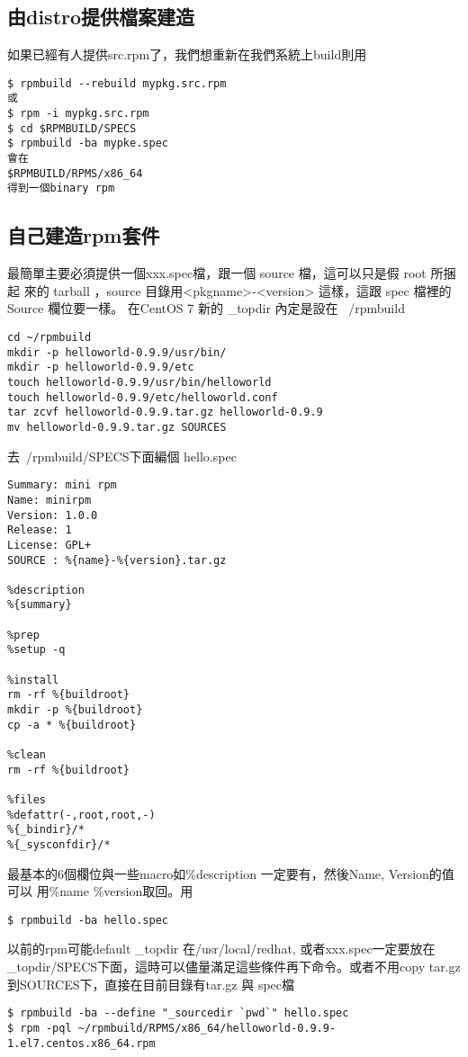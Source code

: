   \subsection{由distro提供檔案建造}
  如果已經有人提供src.rpm了，我們想重新在我們系統上build則用
  \begin{verbatim}
$ rpmbuild --rebuild mypkg.src.rpm
或
$ rpm -i mypkg.src.rpm
$ cd $RPMBUILD/SPECS
$ rpmbuild -ba mypke.spec
會在
$RPMBUILD/RPMS/x86_64
得到一個binary rpm
  \end{verbatim}

  \subsection{自己建造rpm套件 }
  最簡單主要必須提供一個xxx.spec檔，跟一個 source 檔，這可以只是假 root 所捆起
  來的 tarball ，source 目錄用<pkgname>-<version> 這樣，這跟 spec 檔裡的Source
  欄位要一樣。 在CentOS 7 新的 \_topdir 內定是設在 ~/rpmbuild
\begin{verbatim}
cd ~/rpmbuild
mkdir -p helloworld-0.9.9/usr/bin/
mkdir -p helloworld-0.9.9/etc
touch helloworld-0.9.9/usr/bin/helloworld
touch helloworld-0.9.9/etc/helloworld.conf
tar zcvf helloworld-0.9.9.tar.gz helloworld-0.9.9
mv helloworld-0.9.9.tar.gz SOURCES 
\end{verbatim}
  去~/rpmbuild/SPECS下面編個 hello.spec
\begin{verbatim}
Summary: mini rpm
Name: minirpm
Version: 1.0.0
Release: 1
License: GPL+
SOURCE : %{name}-%{version}.tar.gz

%description
%{summary}

%prep
%setup -q

%install
rm -rf %{buildroot}
mkdir -p %{buildroot}
cp -a * %{buildroot}

%clean
rm -rf %{buildroot}

%files
%defattr(-,root,root,-)
%{_bindir}/*
%{_sysconfdir}/*
\end{verbatim}
  最基本的6個欄位與一些macro如\%description 一定要有，然後Name, Version的值可以
  用\%{name} \%{version}取回。用
\begin{verbatim}
$ rpmbuild -ba hello.spec
\end{verbatim}
  以前的rpm可能default \_topdir 在/usr/local/redhat, 或者xxx.spec一定要放在
  \_topdir/SPECS下面，這時可以儘量滿足這些條件再下命令。或者不用copy tar.gz
  到SOURCES下，直接在目前目錄有tar.gz 與 spec檔
\begin{verbatim}
$ rpmbuild -ba --define "_sourcedir `pwd`" hello.spec
$ rpm -pql ~/rpmbuild/RPMS/x86_64/helloworld-0.9.9-1.el7.centos.x86_64.rpm
\end{verbatim}
